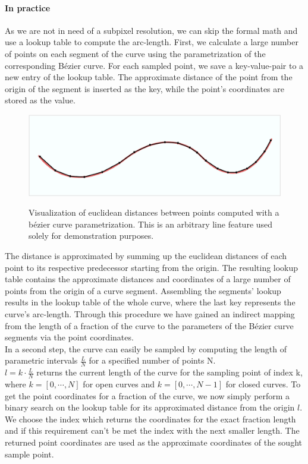 \paragraph{In practice}
As we are not in need of a subpixel resolution, we can skip the formal math and use a lookup table to compute the arc-length. First, we calculate a large number of points on each segment of the curve using the parametrization of the corresponding B\'{e}zier curve. For each sampled point, we save a key-value-pair to a new entry of the lookup table. The approximate distance of the point from the origin of the segment is inserted as the key, while the point's coordinates are stored
as the value. 
\begin{figure}[h!]
\centering
\includegraphics[width=\textwidth]{./resources/figures/distance_computation.pdf}
\label{fig:lookup}
\caption{Visualization of euclidean distances between points computed with a b\'{e}zier curve parametrization. This is an arbitrary line feature used solely for demonstration purposes.}
\end{figure}
The distance is approximated by summing up the euclidean distances of each point to its respective predecessor starting from the origin. The resulting lookup table contains the approximate distances and coordinates of a large number of points from the origin of a curve segment. Assembling the segments' lookup results in the lookup table of the whole curve, where the last key represents the curve's arc-length. Through this procedure we have gained an indirect mapping from the length of a fraction of the curve to the parameters of the B\'{e}zier curve segments via the point coordinates.\\ 
In a second step, the curve can easily be sampled by computing the length of parametric intervals $\frac{L}{N}$ for a specified number of points N.\\
$l=k \cdot \frac{L}{N}$ returns the current length of the curve for the sampling point of index k, where $k=[0,\cdots,N]$ for open curves and $k=[0,\cdots,N-1]$ for closed curves.
To get the point coordinates for a fraction of the curve, we now simply perform a binary search on the lookup table for its approximated distance from the origin $l$. We choose the index which returns the coordinates for the exact fraction length and if this requirement can't be met the index with the next smaller length. The returned point coordinates are used as the approximate coordinates of the sought sample point.
